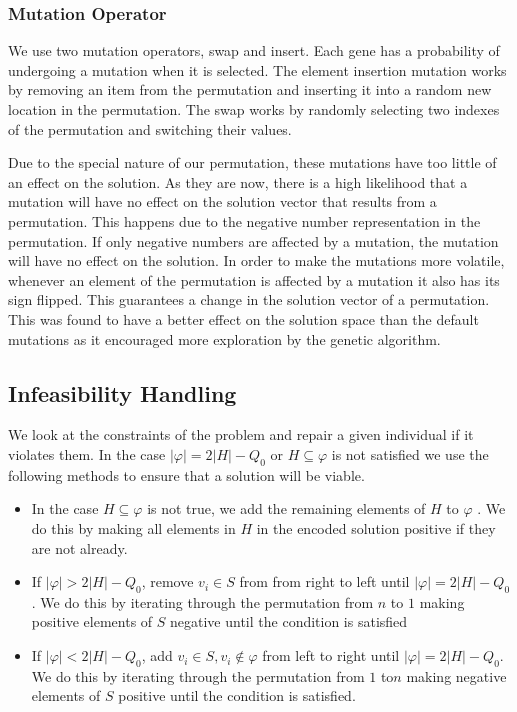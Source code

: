 \documentclass[conference]{IEEEtran}
\begin{document}
\subsubsection{Mutation Operator}
\label{sec:Algorithms:Operators:Mutation}
We use two mutation operators, swap and insert. Each gene has a probability of undergoing a mutation when it is selected. The element insertion mutation works by removing an item from the permutation and inserting it into a random new location in the permutation. The swap works by randomly selecting two indexes of the permutation and switching their values.

Due to the special nature of our permutation, these mutations have too little of an effect on the solution. As they are now, there is a high likelihood that a mutation will have no effect on the solution vector that results from a permutation. This happens due to the negative number representation in the permutation. If only negative numbers are affected by a mutation, the mutation will have no effect on the solution. In order to make the mutations more volatile, whenever an element of the permutation is affected by a mutation it also has its sign flipped. This guarantees a change in the solution vector of a permutation. This was found to have a better effect on the solution space than the default mutations as it encouraged more exploration by the genetic algorithm.

\subsection{Infeasibility Handling}
\label{sec:Algorithms:Infeasibility}

We look at the constraints of the problem and repair a given individual if it violates them. In the case $|\varphi| = 2|H|-Q_0$ or $H \subseteq \varphi$ is not satisfied we use the following methods to ensure that a solution will be viable.
\begin{itemize}
\item In the case $H \subseteq \varphi$ is not true, we add the remaining elements of $H$ to $\varphi$ . We do this by making all elements in $H$ in the encoded solution positive if they are not already.

\item If $|\varphi| > 2|H|-Q_0$, remove $v_i \in S$ from from right to left until $|\varphi| = 2|H|-Q_0$. We do this by iterating through the permutation from $n$ to $1$ making positive elements of $S$ negative until the condition is satisfied 

\item If  $|\varphi| < 2|H|-Q_0$, add $v_i \in S, v_i \notin \varphi$ from left to right until $|\varphi| = 2|H|-Q_0$. We do this by iterating through the permutation from $1$ to$n$ making negative elements of $S$ positive until the condition is satisfied.
\end{itemize}
\end{document}
